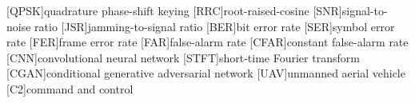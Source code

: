 [QPSK]{quadrature phase-shift keying}
[RRC]{root-raised-cosine}
[SNR]{signal-to-noise ratio}
[JSR]{jamming-to-signal ratio}
[BER]{bit error rate}
[SER]{symbol error rate}
[FER]{frame error rate}
[FAR]{false-alarm rate}
[CFAR]{constant false-alarm rate}
[CNN]{convolutional neural network}
[STFT]{short-time Fourier transform}
[CGAN]{conditional generative adversarial network}
[UAV]{unmanned aerial vehicle}
[C2]{command and control}

